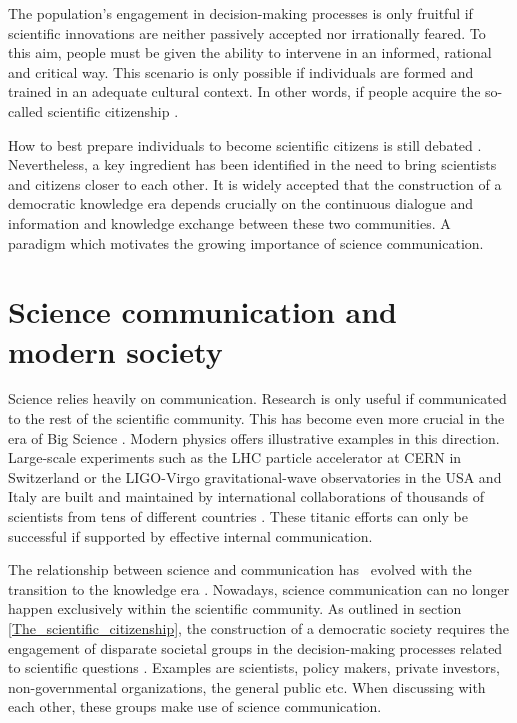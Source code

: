 The population's engagement in decision-making processes is only fruitful if scientific innovations are neither passively accepted nor irrationally feared. To this aim, people must be given the ability to intervene in an informed, rational and critical way. This scenario is only possible if individuals are formed and trained in an adequate cultural context. In other words, if people acquire the so-called scientific citizenship \cite{Arnason}.

How to best prepare individuals to become scientific citizens is still debated \cite{Nowotny}. Nevertheless, a key ingredient has been identified in the need to bring scientists and citizens closer to each other. It is widely accepted that the construction of a democratic knowledge era depends crucially on the continuous dialogue and information and knowledge exchange between these two communities. A paradigm which motivates the growing importance of science communication.

\section{Science communication and modern society} \label{Science_communication_and_modern_society}    
Science relies heavily on communication. Research is only useful if communicated to the rest of the scientific community. This has become even more crucial in the era of Big Science \cite{Galison}. Modern physics offers illustrative examples in this direction. Large-scale experiments such as the LHC particle accelerator at CERN in Switzerland or the LIGO-Virgo gravitational-wave observatories in the USA and Italy are built and maintained by international collaborations of thousands of scientists from tens of different countries \cite{CERN, LIGO, Virgo}. These titanic efforts can only be successful if supported by effective internal communication.  

The relationship between science and communication has \, evolved with the transition to the knowledge era \cite{Holliman}. Nowadays, science communication can no longer happen exclusively within the scientific community. As outlined in section \ref{The_scientific_citizenship}, the construction of a democratic society requires the engagement of disparate societal groups in the decision-making processes related to scientific questions \cite{Wynne}. Examples are scientists, policy makers, private investors, non-governmental organizations, the general public etc. When discussing with each other, these groups make use of science communication.

